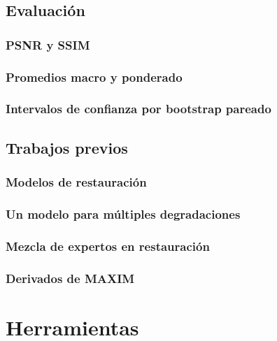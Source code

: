 \documentclass[
  11pt,
  oneside,
  english,
  spanish,
  singlespacing,
  headsepline
]{MastersDoctoralThesis}
\begin{document}
\section{Evaluación}
\label{sec:evaluacion}

\subsection{PSNR y SSIM}
\label{sec:psnr-ssim}

\subsection{Promedios macro y ponderado}
\label{sec:macro-ponderado}

\subsection{Intervalos de confianza por bootstrap pareado}
\label{sec:bootstrap}

\section{Trabajos previos}
\label{sec:trabajos-previos}

\subsection{Modelos de restauración}
\label{sec:sota-restauracion}

\subsection{Un modelo para múltiples degradaciones}
\label{sec:sota-all-in-one}

\subsection{Mezcla de expertos en restauración}
\label{sec:sota-moe}

\subsection{Derivados de MAXIM}
\label{sec:sota-maxim}

\chapter{Herramientas}
\label{chap:herramientas}
\end{document}
